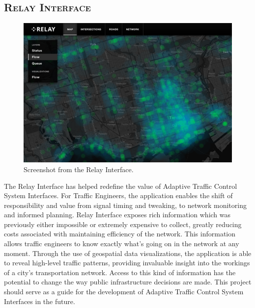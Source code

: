 \documentclass[a4paper,10pt]{article}
\begin{document}
\begin{multicols}{2}
\section{\textsc{Relay Interface}}

\begin{figure}[H]
  \begin{centering}
    \includegraphics[scale=0.35]{figures/flow-2.png}
    \caption{Screenshot from the Relay Interface.}
    \label{fig:interface}
  \end{centering}
\end{figure}

The Relay Interface has helped redefine the value of Adaptive Traffic Control System Interfaces. For Traffic Engineers, the application enables the shift of responsibility and value from signal timing and tweaking, to network monitoring and informed planning. Relay Interface exposes rich information which was previously either impossible or extremely expensive to collect, greatly reducing costs associated with maintaining efficiency of the network. This information allows traffic engineers to know exactly what's going on in the network at any moment. Through the use of geospatial data visualizations, the application is able to reveal high-level traffic patterns, providing invaluable insight into the workings of a city's transportation network. Access to this kind of information has the potential to change the way public infrastructure decisions are made. This project should serve as a guide for the development of Adaptive Traffic Control System Interfaces in the future.




\end{multicols}
\end{document}
